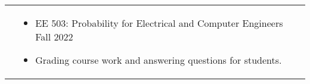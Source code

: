 \documentclass[letterpaper, 10pt]{article}
\begin{document}
\begin{longtable}{p{1.3in}p{4.8in}}

{\color{black}{Teaching Experience}} 
&  \begin{itemize}[leftmargin=10pt, itemsep=-5pt, topsep=0pt,before=\textbf{Teaching assistant, University of Southern California}]
    \item EE 503: Probability for Electrical and Computer Engineers \hfill Fall 2022
    \item  Grading course work and answering questions for students.
  \end{itemize}\\ 














\end{longtable}
\end{document}
